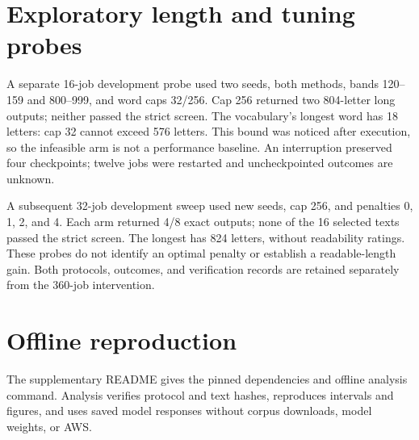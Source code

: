 \documentclass[11pt]{article}
\begin{document}
\section{Exploratory length and tuning probes}
A separate 16-job development probe used two seeds, both methods, bands 120--159 and 800--999, and word caps 32/256. Cap 256 returned two 804-letter long outputs; neither passed the strict screen. The vocabulary's longest word has 18 letters: cap 32 cannot exceed 576 letters. This bound was noticed after execution, so the infeasible arm is not a performance baseline. An interruption preserved four checkpoints; twelve jobs were restarted and uncheckpointed outcomes are unknown.

A subsequent 32-job development sweep used new seeds, cap 256, and penalties 0, 1, 2, and 4. Each arm returned 4/8 exact outputs; none of the 16 selected texts passed the strict screen. The longest has 824 letters, without readability ratings. These probes do not identify an optimal penalty or establish a readable-length gain. Both protocols, outcomes, and verification records are retained separately from the 360-job intervention.

\section{Offline reproduction}
The supplementary README gives the pinned dependencies and offline analysis command. Analysis verifies protocol and text hashes, reproduces intervals and figures, and uses saved model responses without corpus downloads, model weights, or AWS.
\end{document}
